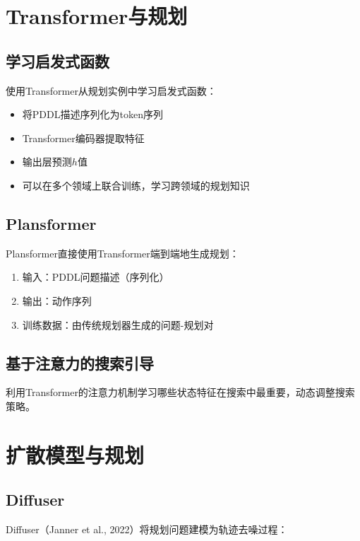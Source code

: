 \section{Transformer与规划 \grad}

\subsection{学习启发式函数}

使用Transformer从规划实例中学习启发式函数：
\begin{itemize}
  \item 将PDDL描述序列化为token序列
  \item Transformer编码器提取特征
  \item 输出层预测$h$值
  \item 可以在多个领域上联合训练，学习跨领域的规划知识
\end{itemize}

\subsection{Plansformer}

Plansformer直接使用Transformer端到端地生成规划：
\begin{enumerate}
  \item 输入：PDDL问题描述（序列化）
  \item 输出：动作序列
  \item 训练数据：由传统规划器生成的问题-规划对
\end{enumerate}

\subsection{基于注意力的搜索引导}

利用Transformer的注意力机制学习哪些状态特征在搜索中最重要，动态调整搜索策略。

\section{扩散模型与规划 \self}

\subsection{Diffuser}

Diffuser（Janner et al., 2022）将规划问题建模为轨迹去噪过程：

